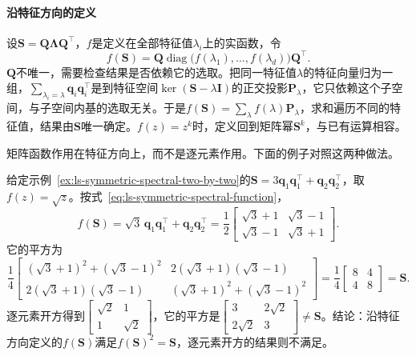 \paragraph{沿特征方向的定义}

设$\bm S=\bm Q\bm\Lambda\bm Q^\top$，$f$是定义在全部特征值$\lambda_i$上的实函数，令
\begin{equation}
 f(\bm S)=\bm Q\operatorname{diag}\bigl(f(\lambda_1),\ldots,f(\lambda_d)\bigr)\bm Q^\top.
 \label{eq:ls-symmetric-spectral-function}
\end{equation}
$\bm Q$不唯一，需要检查结果是否依赖它的选取。把同一特征值$\lambda$的特征向量归为一组，$\sum_{\lambda_i=\lambda}\bm q_i\bm q_i^\top$是到特征空间$\ker(\bm S-\lambda\bm I)$的正交投影$\bm P_\lambda$，它只依赖这个子空间，与子空间内基的选取无关。于是$f(\bm S)=\sum_\lambda f(\lambda)\bm P_\lambda$，求和遍历不同的特征值，结果由$\bm S$唯一确定。$f(z)=z^k$时，定义回到矩阵幂$\bm S^k$，与已有运算相容。

矩阵函数作用在特征方向上，而不是逐元素作用。下面的例子对照这两种做法。
\begin{example}[矩阵平方根与逐元素开方]
\label{ex:ls-matrix-square-root-two-by-two}
给定示例~\ref{ex:ls-symmetric-spectral-two-by-two}的$\bm S=3\bm q_1\bm q_1^\top+\bm q_2\bm q_2^\top$，取$f(z)=\sqrt z$。按式~\eqref{eq:ls-symmetric-spectral-function}，
\[
 f(\bm S)=\sqrt3\,\bm q_1\bm q_1^\top+\bm q_2\bm q_2^\top
 =\frac12\begin{bmatrix}\sqrt3+1&\sqrt3-1\\\sqrt3-1&\sqrt3+1\end{bmatrix}.
\]
它的平方为
\[
 \frac14\begin{bmatrix}(\sqrt3+1)^2+(\sqrt3-1)^2&2(\sqrt3+1)(\sqrt3-1)\\2(\sqrt3+1)(\sqrt3-1)&(\sqrt3+1)^2+(\sqrt3-1)^2\end{bmatrix}
 =\frac14\begin{bmatrix}8&4\\4&8\end{bmatrix}=\bm S .
\]
逐元素开方得到$\left[\begin{smallmatrix}\sqrt2&1\\1&\sqrt2\end{smallmatrix}\right]$，它的平方是$\left[\begin{smallmatrix}3&2\sqrt2\\2\sqrt2&3\end{smallmatrix}\right]\neq\bm S$。结论：沿特征方向定义的$f(\bm S)$满足$f(\bm S)^2=\bm S$，逐元素开方的结果则不满足。
\end{example}

